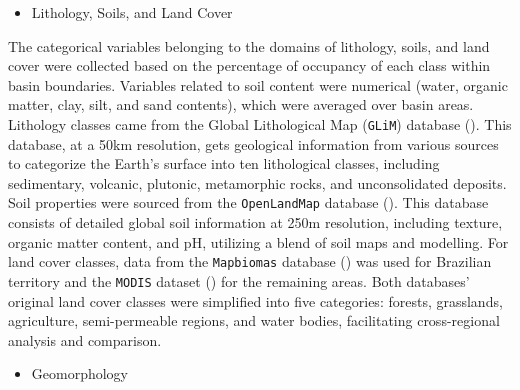 \documentclass[12pt]{article}
\begin{document}
\begin{itemize}
    \item Lithology, Soils, and Land Cover
\end{itemize}

\par The categorical variables belonging to the domains of lithology, soils, and land cover were collected based on the percentage of occupancy of each class within basin boundaries. Variables related to soil content were numerical (water, organic matter, clay, silt, and sand contents), which were averaged over basin areas. Lithology classes came from the Global Lithological Map (\texttt{GLiM}) database (\cite{hartmann2012}). This database, at a 50km resolution, gets geological information from various sources to categorize the Earth's surface into ten lithological classes, including sedimentary, volcanic, plutonic, metamorphic rocks, and unconsolidated deposits. Soil properties were sourced from the \texttt{OpenLandMap} database (\cite{hengl2017}). This database consists of detailed global soil information at 250m resolution, including texture, organic matter content, and pH, utilizing a blend of soil maps and modelling. For land cover classes, data from the \texttt{Mapbiomas} database (\cite{souza2020}) was used for Brazilian territory and the \texttt{MODIS} dataset (\cite{friedl201}) for the remaining areas. Both databases' original land cover classes were simplified into five categories: forests, grasslands, agriculture, semi-permeable regions, and water bodies, facilitating cross-regional analysis and comparison.

\begin{itemize}
    \item Geomorphology
\end{itemize}
\end{document}
